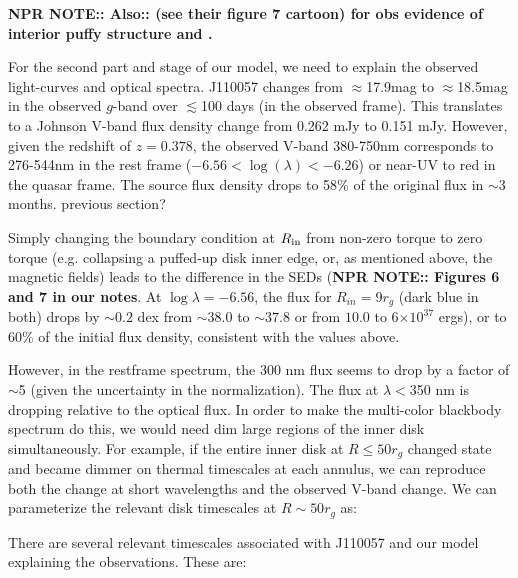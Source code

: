 \documentclass[11pt,a4paper]{article}
\begin{document}
{\bf NPR NOTE:: Also:: \citet{Gardner_Done2017} 
(see their figure 7 cartoon) for obs evidence of interior puffy structure
and \citet{Jiang_Stone_Davis2016}. 
}

For the second part and stage of our model, we need to explain the 
observed light-curves and optical spectra. 
%
J110057 changes from $\approx$17.9mag to $\approx$18.5mag in the
observed $g$-band over $\lesssim$100 days (in the observed frame).
This translates to a Johnson V-band flux density change from 0.262 mJy
to 0.151 mJy.  However, given the redshift of $z=0.378$, the observed
V-band 380-750nm corresponds to 276-544nm in the rest frame ($-6.56 <
\log (\lambda) < -6.26$) or near-UV to red in the quasar frame. The
source flux density drops to 58\% of the original flux in $\sim$3
months. %
previous section?

Simply changing the boundary condition at $R_{\rm in}$ from non-zero
torque to zero torque (e.g. collapsing a puffed-up disk inner edge,
or, as mentioned above, the magnetic fields) leads to the difference
in the SEDs ({\bf NPR NOTE:: Figures 6 and 7 in our notes}.  At $\log
\lambda = −6.56$, the flux for $R_{in} = 9 r_{g}$ (dark blue in both)
drops by $\sim0.2$ dex from $\sim38.0$ to $\sim37.8 $ or from $10.0$
to 6$\times 10^{37}$ ergs), or to 60\% of the initial flux density,
consistent with the values above.

However, in the restframe spectrum, the 300 nm flux seems to drop by a
factor of $\sim$5 (given the uncertainty in the normalization). The
flux at $\lambda < $350 nm is dropping relative to the optical
flux. In order to make the multi-color blackbody spectrum do this, we
would need dim large regions of the inner disk simultaneously.  For
example, if the entire inner disk at $R \leq 50 r_{g}$ changed state
and became dimmer on thermal timescales at each annulus, we can
reproduce both the change at short wavelengths and the observed V-band
change.
We can parameterize the relevant disk timescales at $R\sim 50 r_{g}$ as:


There are several relevant timescales associated with J110057 and our 
model explaining the observations. These are: 
\end{document}
